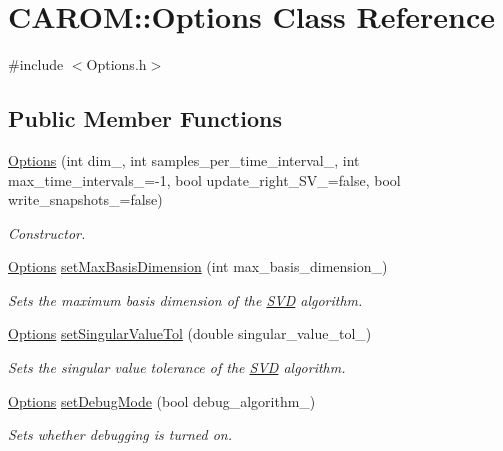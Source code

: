 \hypertarget{class_c_a_r_o_m_1_1_options}{\section{C\-A\-R\-O\-M\-:\-:Options Class Reference}
\label{class_c_a_r_o_m_1_1_options}
}


{\ttfamily \#include $<$Options.\-h$>$}

\subsection*{Public Member Functions}
\begin{DoxyCompactItemize}
\item 
\hyperlink{class_c_a_r_o_m_1_1_options_a874b8ffeae177a17d13aa1dacd54b3b1}{Options} (int dim\-\_\-, int samples\-\_\-per\-\_\-time\-\_\-interval\-\_\-, int max\-\_\-time\-\_\-intervals\-\_\-=-\/1, bool update\-\_\-right\-\_\-\-S\-V\-\_\-=false, bool write\-\_\-snapshots\-\_\-=false)
\begin{DoxyCompactList}\small\item\em Constructor. \end{DoxyCompactList}\item 
\hyperlink{class_c_a_r_o_m_1_1_options}{Options} \hyperlink{class_c_a_r_o_m_1_1_options_a7a4f3556eb166ad69a36f6afdd38fc34}{set\-Max\-Basis\-Dimension} (int max\-\_\-basis\-\_\-dimension\-\_\-)
\begin{DoxyCompactList}\small\item\em Sets the maximum basis dimension of the \hyperlink{class_c_a_r_o_m_1_1_s_v_d}{S\-V\-D} algorithm. \end{DoxyCompactList}\item 
\hyperlink{class_c_a_r_o_m_1_1_options}{Options} \hyperlink{class_c_a_r_o_m_1_1_options_a4be02c86ed3eac7648c46c7df04b1ef3}{set\-Singular\-Value\-Tol} (double singular\-\_\-value\-\_\-tol\-\_\-)
\begin{DoxyCompactList}\small\item\em Sets the singular value tolerance of the \hyperlink{class_c_a_r_o_m_1_1_s_v_d}{S\-V\-D} algorithm. \end{DoxyCompactList}\item 
\hyperlink{class_c_a_r_o_m_1_1_options}{Options} \hyperlink{class_c_a_r_o_m_1_1_options_a8ab6dca0209a9631b2f2d92d25266a3b}{set\-Debug\-Mode} (bool debug\-\_\-algorithm\-\_\-)
\begin{DoxyCompactList}\small\item\em Sets whether debugging is turned on. \end{DoxyCompactList}\item 

\end{DoxyCompactItemize}
